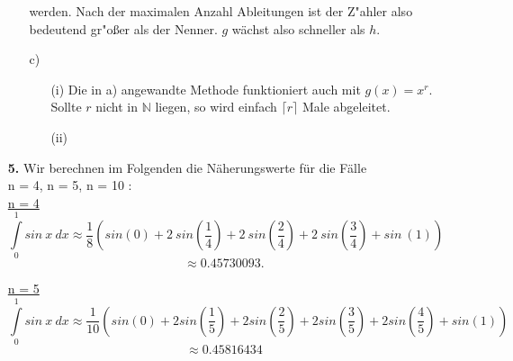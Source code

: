 \documentclass[a4paper,11pt]{article}
\begin{document}
\begin{enumerate}
\begin{enumerate}
                    werden. Nach der maximalen Anzahl Ableitungen ist der Z"ahler also bedeutend gr"oßer als der Nenner.
                    $g$ wächst also schneller als $h$.
                \item[c)]
                    \begin{enumerate}
                        \item[(i)]
                            Die in a) angewandte Methode funktioniert auch mit $g(x)=x^r$. Sollte $r$ nicht in $\mathbb{N}$ liegen, so wird einfach
                            $\lceil r \rceil$ Male abgeleitet.
                        \item[(ii)]
                            
                    \end{enumerate}
            \end{enumerate}

        \item[\textbf{5.}]
            Wir berechnen im Folgenden die Näherungswerte für die Fälle \\ n = 4, n = 5, n = 10 : \\[0.5cm]
            \underline{n = 4}
            $$ \int\limits_{0}^{1} sin \ x \ dx \approx \frac{1}{8}\left(sin(0) + 2 \ sin \left(\frac{1}{4}\right)+ 2 \ sin\left(\frac{2}{4}\right) + 2 \ sin\left(\frac{3}{4}\right)+ sin \ (1)\right)$$
            $$ \approx 0.45730093.$$ 

             \underline{n = 5}
            $$ \int\limits_{0}^{1} sin \ x \ dx \approx \frac{1}{10}\left(sin(0) +  2 sin\left(\frac{1}{5}\right) + 2sin\left(\frac{2}{5}\right) + 2 sin\left( \frac{3}{5}\right) + 2 sin\left( \frac{4}{5}\right) + sin(1)\right) $$
            $$ \approx 0.45816434 $$


\end{enumerate}
\end{document}
